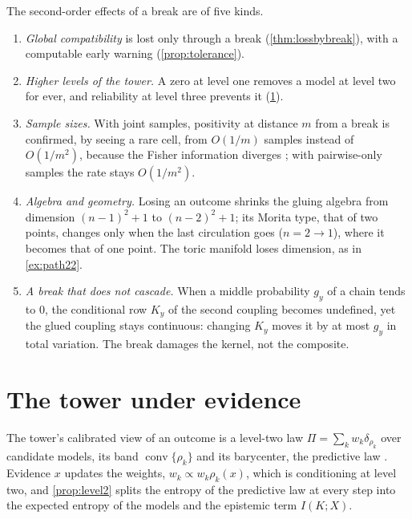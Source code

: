\documentclass[11pt]{article}
\theoremstyle{definition}
\theoremstyle{remark}
\begin{document}
The second-order effects of a break are of five kinds.
\begin{enumerate}[label=(\alph*),leftmargin=*]
\item \emph{Global compatibility} is lost only through a break (\cref{thm:lossbybreak}), with a computable early warning
  (\cref{prop:tolerance}).
\item \emph{Higher levels of the tower.} A zero at level one removes a model at level two for ever, and reliability at level three
  prevents it (\cref{sec:towerdyn}).
\item \emph{Sample sizes.} With joint samples, positivity at distance $m$ from a break is confirmed, by seeing a rare cell, from $O(1/m)$
  samples instead of $O(1/m^2)$, because the Fisher information diverges \cite[\S3]{Bridges}; with pairwise-only samples the rate stays
  $O(1/m^2)$.
\item \emph{Algebra and geometry.} Losing an outcome shrinks the gluing algebra from dimension $(n-1)^2+1$ to $(n-2)^2+1$; its Morita
  type, that of two points, changes only when the last circulation goes ($n=2\to1$), where it becomes that of one point. The toric
  manifold loses dimension, as in \cref{ex:path22}.
\item \emph{A break that does not cascade.} When a middle probability $g_y$ of a chain tends to $0$, the conditional row $K_y$ of the second
  coupling becomes undefined, yet the glued coupling stays continuous: changing $K_y$ moves it by at most $g_y$ in total variation. The break damages the
  kernel, not the composite.
\end{enumerate}

\section{The tower under evidence}\label{sec:towerdyn}

The tower's calibrated view of an outcome is a level-two law $\Pi=\sum_kw_k\delta_{\rho_k}$ over candidate models, its band
$\operatorname{conv}\{\rho_k\}$ and its barycenter, the predictive law \cite{Tower}. Evidence $x$ updates the weights,
$w_k\propto w_k\rho_k(x)$, which is conditioning at level two, and \cref{prop:level2} splits the entropy of the predictive law at every
step into the expected entropy of the models and the epistemic term $I(K;X)$.
\end{document}
